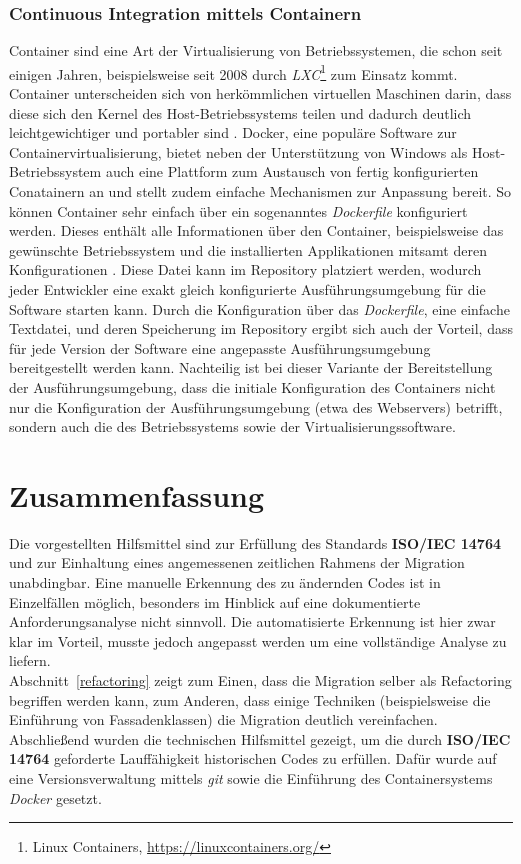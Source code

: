         \subsubsection{Continuous Integration mittels Containern}
        Container sind eine Art der Virtualisierung von Betriebssystemen, die schon seit einigen Jahren, beispielsweise 
        seit 2008 durch \textit{LXC}\footnote{Linux Containers, \url{https://linuxcontainers.org/}} zum Einsatz kommt. 
        Container unterscheiden sich von herkömmlichen virtuellen Maschinen darin, dass diese sich den Kernel des 
        Host-Betriebssystems teilen und dadurch deutlich leichtgewichtiger und portabler sind \cite{scheepers_virtualization_2014}. 
        Docker, eine populäre Software zur Containervirtualisierung, bietet neben der Unterstützung von Windows als Host-
        Betriebssystem auch eine Plattform zum Austausch von fertig konfigurierten Conatainern an und stellt zudem einfache 
        Mechanismen zur Anpassung bereit. So können Container sehr einfach über ein sogenanntes \textit{Dockerfile} konfiguriert 
        werden. Dieses enthält alle Informationen über den Container, beispielsweise das gewünschte Betriebssystem und die 
        installierten Applikationen mitsamt deren Konfigurationen \cite{anderson_docker_2015}. Diese Datei kann im Repository platziert werden, wodurch jeder 
        Entwickler eine exakt gleich konfigurierte Ausführungsumgebung für die Software starten kann. Durch die Konfiguration 
        über das \textit{Dockerfile}, eine einfache Textdatei, und deren Speicherung im Repository ergibt sich auch der Vorteil, 
        dass für jede Version der Software eine angepasste Ausführungsumgebung bereitgestellt werden kann. Nachteilig ist bei
        dieser Variante der Bereitstellung der Ausführungsumgebung, dass die initiale Konfiguration des Containers nicht nur 
        die Konfiguration der Ausführungsumgebung (etwa des Webservers) betrifft, sondern auch die des Betriebssystems sowie 
        der Virtualisierungssoftware.

\section{Zusammenfassung}
Die vorgestellten Hilfsmittel sind zur Erfüllung des Standards \textbf{ISO/IEC 14764} und zur Einhaltung eines angemessenen 
zeitlichen Rahmens der Migration unabdingbar. Eine manuelle Erkennung des zu ändernden Codes ist in Einzelfällen möglich, 
besonders im Hinblick auf eine dokumentierte Anforderungsanalyse nicht sinnvoll. Die automatisierte Erkennung ist hier 
zwar klar im Vorteil, musste jedoch angepasst werden um eine vollständige Analyse zu liefern. \\
Abschnitt~\ref{refactoring} zeigt zum Einen, dass die Migration selber als Refactoring begriffen werden kann, zum Anderen, dass 
einige Techniken (beispielsweise die Einführung von Fassadenklassen) die Migration deutlich vereinfachen. \\
Abschließend wurden die technischen Hilfsmittel gezeigt, um die durch \textbf{ISO/IEC 14764} geforderte Lauffähigkeit historischen 
Codes zu erfüllen. Dafür wurde auf eine Versionsverwaltung mittels \textit{git} sowie die Einführung des Containersystems 
\textit{Docker} gesetzt.
